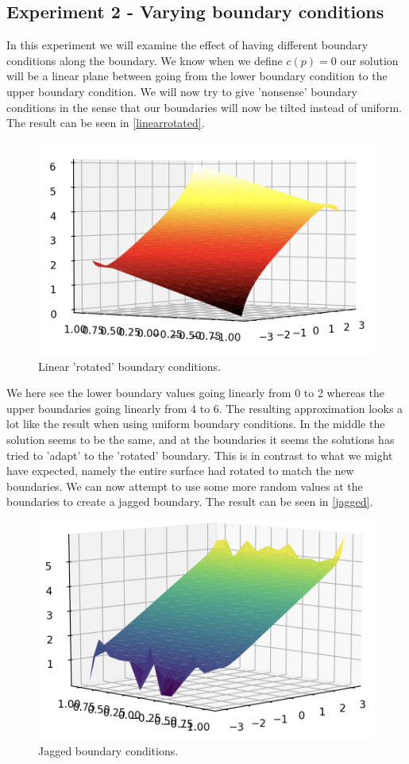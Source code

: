 \subsection{Experiment 2 - Varying boundary conditions}
In this experiment we will examine the effect of having different boundary conditions along the boundary. We know when we define $c(p) = 0$ our solution will be a linear plane between going from the lower boundary condition to the upper boundary condition. We will now try to give 'nonsense' boundary conditions in the sense that our boundaries will now be tilted instead of uniform. The result can be seen in \autoref{linearrotated}.
\begin{figure}
	\centering
	\includegraphics[width=\linewidth]{Materials/boundary}
	\caption{Linear 'rotated' boundary conditions.}
	\label{linearrotated}
\end{figure}
We here see the lower boundary values going linearly from 0 to 2 whereas the upper boundaries going linearly from 4 to 6. The resulting approximation looks a lot like the result when using uniform boundary conditions. In the middle the solution seems to be the same, and at the boundaries it seems the solutions has tried to 'adapt' to the 'rotated' boundary. This is in contrast to what we might have expected, namely the entire surface had rotated to match the new boundaries. We can now attempt to use some more random values at the boundaries to create a jagged boundary. The result can be seen in \autoref{jagged}.
 \begin{figure}
 	\centering
 	\includegraphics[width=\linewidth]{Materials/jagged}
 	\caption{Jagged boundary conditions.}
 	\label{jagged}
 \end{figure}
